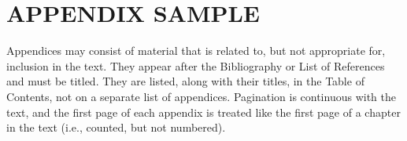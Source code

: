 \chapter{APPENDIX SAMPLE}
Appendices may consist of material that is related to, but not appropriate for, inclusion in the text. They appear after the Bibliography or List of References and must be titled. They are listed, along with their titles, in the Table of Contents, not on a separate list of appendices. Pagination is continuous with the text, and the first page of each appendix is treated like the first page of a chapter in the text (i.e., counted, but not numbered).
